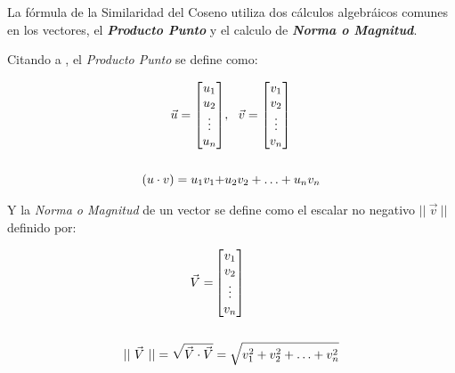     La fórmula de la Similaridad del Coseno utiliza dos cálculos algebráicos comunes en los vectores, el \textbf{\textit{Producto Punto}} y el calculo de \textbf{\textit{Norma o Magnitud}}.

    Citando a \parencite{poole2007álgebra}, el \textit{Producto Punto} se define como:

    \begin{equation}
        \begin{split}
            \vec{u} = \begin{bmatrix}
                u_1
                \\
                u_2
                \\
                \vdots
                \\
                u_n
            \end{bmatrix} &,  \ \
            \vec{v} = \begin{bmatrix}
                v_1
                \\
                v_2
                \\
                \vdots
                \\
                v_n
            \end{bmatrix}
            \\
            \\
            (u \cdot v) = u_1 v_1 + &u_2 v_2 + \hdots + u_n v_n
        \end{split}
        \addequation{Definición de Producto Punto}
        \label{eq:DefProductoPunto}
    \end{equation}

    \newpage

    Y la \textit{Norma o Magnitud} de un vector se define como el escalar no negativo $|| \ \vec{v} \ ||$ definido por: 

    \begin{equation}
        \begin{split}
            \vec{V} = &\begin{bmatrix}
                v_1
                \\
                v_2
                \\
                \vdots
                \\
                v_n
            \end{bmatrix}
            \\
            \\
            || \ \vec{V}  \ || = \sqrt{\vec{V} \cdot \vec{V}} &= \sqrt{v_1^2 + v_2^2 + \hdots + v_n^2}
        \end{split}
        \addequation{Definición de Norma o Magnitud}
    \end{equation}    

